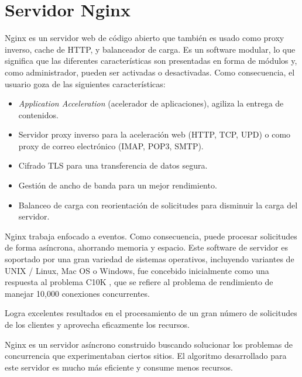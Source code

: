 \section{Servidor Nginx}


Nginx \citep{WEBSITE:32} es un servidor web de código abierto que también es usado como proxy inverso, cache de HTTP, y balanceador de carga.  Es un software modular, lo que significa que las diferentes características son presentadas en forma de módulos y, como administrador, pueden ser activadas o desactivadas. Como consecuencia, el usuario goza de las siguientes características:

\begin{itemize}
	\item \textit{Application Acceleration} (acelerador de aplicaciones), agiliza la entrega de contenidos.
	
	\item Servidor proxy inverso para la aceleración web (HTTP, TCP, UPD) o como proxy de correo electrónico (IMAP, POP3, SMTP).
	
	\item Cifrado TLS para una transferencia de datos segura.
	
	\item Gestión de ancho de banda para un mejor rendimiento.
	
	\item Balanceo de carga con reorientación de solicitudes para disminuir la carga del servidor.
	
\end{itemize}


Nginx trabaja enfocado a eventos. Como consecuencia, puede procesar solicitudes de forma asíncrona, ahorrando memoria y espacio. Este software de servidor es soportado por una gran variedad de sistemas operativos, incluyendo variantes de UNIX / Linux, Mac OS o Windows, fue concebido inicialmente como una respuesta al problema C10K \citep{WEBSITE:33}, que se refiere al problema de rendimiento de manejar 10,000 conexiones concurrentes.

Logra excelentes resultados en el procesamiento de un gran número de solicitudes de los clientes y aprovecha eficazmente los recursos.

Nginx es un servidor asíncrono construido buscando solucionar los problemas de concurrencia que experimentaban ciertos sitios. El algoritmo desarrollado para este servidor es mucho más eficiente y consume menos recursos.

